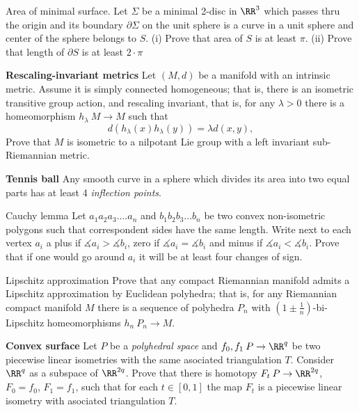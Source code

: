 \begin{pr}{}{Area of minimal surface.} Let $\Sigma$ be a minimal 2-disc in $\RR^3$ which passes thru the origin and its boundary $\partial\Sigma$ on the unit sphere is a curve in a unit sphere and center of the sphere belongs to $S$.
(i) Prove that area of $S$ is at least $\pi$.
(ii) Prove that length of $\partial S$ is at least $2\cdot\pi$
\end{pr}

\begin{pr}
{\bf  Rescaling-invariant metrics} Let $(M,d)$ be a manifold with an intrinsic metric. 
Assume it is simply connected homogeneous; 
that is, there is an isometric transitive group action, and rescaling invariant, 
that is, for any $\lambda>0$ there is a homeomorphism $h_\lambda\:M\to M$ such that $$d(h_\lambda(x)h_\lambda(y))=\lambda d(x,y),$$ Prove that $M$ is isometric to a nilpotant Lie group with a left invariant sub-Riemannian metric.
\end{pr}

\begin{pr}
{\bf  Tennis ball} \cite{arnold}\cite{angenent} Any smooth curve in a sphere which divides its area into two equal parts has at least 4 {\it inflection points}.
\end{pr}

\begin{pr}{\easy}{Cauchy lemma} Let $a_1a_2a_3....a_n$ and $b_1b_2b_3...b_n$ be two convex non-isometric polygons such that correspondent sides have the same length.
Write next to each vertex $a_i$  a plus if $\measuredangle a_i>\measuredangle b_i$, zero if  $\measuredangle a_i=\measuredangle b_i$ and minus if $\measuredangle a_i<\measuredangle b_i$.
Prove that if one would go around $a_i$ it will be at least four changes of sign.
\end{pr}

\begin{pr}{}{Lipschitz approximation}
Prove that any compact Riemannian manifold admits a Lipschitz approximation by Euclidean polyhedra; 
that is, for any Riemannian compact manifold $M$ there is a sequence of polyhedra $P_n$ with $(1\pm\tfrac1n)$-bi-Lipschitz homeomorphisms $h_n\:P_n\to M$.
\end{pr}

\begin{pr}{}
{\bf  Convex surface}
Let $P$ be a \emph{polyhedral space} and $f_0,f_1\:P\to \RR^q$ be two piecewise linear isometries with the same asociated triangulation $T$.
Consider $\RR^q$ as a subspace of $\RR^{2q}$.
Prove that there is homotopy $F_t\:P\to\RR^{2q}$, $F_0=f_0$, $F_1=f_1$, such that for each $t\in[0,1]$ the map $F_t$ is a piecewise linear isometry with asociated triangulation $T$.
\end{pr}

